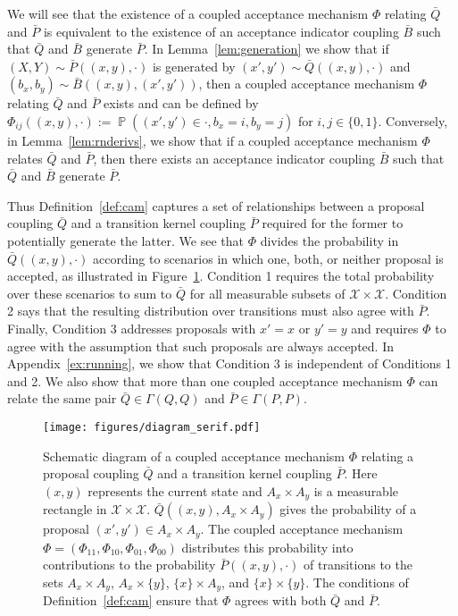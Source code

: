 \documentclass[aihp]{imsart}
\theoremstyle{plain}
\theoremstyle{remark}
\theoremstyle{definition} \newtheorem{example}{Example}
\renewcommand{\P}{\operatorname{\mathbb{P}}}
\newcommand{\calX}{\mathcal{X}}
\newcommand{\cd}{\cdot}
\newcommand{\calXp}{\calX \times \calX}
\newcommand{\bp}{\bar P}
\newcommand{\bq}{\bar Q}
\newcommand{\bb}{\bar B}
\newcommand{\sx}{\{ x \}}
\newcommand{\sy}{\{ y \}}
\newcommand{\xy}{(x,y)}
\newcommand{\xyp}{(x',y')}
\newcommand{\axy}{A_x \times A_y}
\begin{document}
We will see that the existence of a coupled acceptance mechanism $\Phi$ relating $\bq$ and $\bp$ is
equivalent to the existence of an acceptance indicator coupling $\bb$ such that $\bq$ and $\bb$
generate $\bp$. In Lemma~\ref{lem:generation} we show that if $(X,Y) \sim \bp(\xy, \cdot)$ is
generated by $\xyp \sim \bq(\xy, \cdot)$ and $(b_x, b_y) \sim \bb(\xy, \xyp)$, then a coupled
acceptance mechanism $\Phi$ relating $\bq$ and $\bp$ exists and can be defined by $\Phi_{ij}(\xy,
\cd) := \P(\xyp \in \cd, b_x = i, b_y = j)$ for ${i, j \in \{0,1\}}$. Conversely, in
Lemma~\ref{lem:rnderivs}, we show that if a coupled acceptance mechanism $\Phi$ relates $\bq$ and
$\bp$, then there exists an acceptance indicator coupling $\bb$ such that $\bq$ and $\bb$ generate
$\bp$.

Thus Definition~\ref{def:cam} captures a set of relationships between a proposal coupling $\bq$ and
a transition kernel coupling $\bp$ required for the former to potentially generate the latter. We
see that $\Phi$ divides the probability in $\bq(\xy,\cd)$ according to scenarios in which one, both,
or neither proposal is accepted, as illustrated in Figure~\ref{fig:cam}. Condition 1 requires
the total probability over these scenarios to sum to $\bq$ for all measurable subsets of $\calXp$.
Condition 2 says that the resulting distribution over transitions must also agree with $\bp$. Finally,
Condition 3 addresses proposals with $x' = x$ or $y' = y$ and requires $\Phi$ to agree with
the assumption that such proposals are always accepted. In Appendix~\ref{ex:running}, we show that
Condition 3 is independent of Conditions 1 and 2. We also show that more than one coupled acceptance mechanism $\Phi$
can relate the same pair $\bq \in \Gamma(Q,Q)$ and $\bp \in \Gamma(P,P)$.

\begin{figure}[t]
\centering
\texttt{[image: figures/diagram\_serif.pdf]}
\caption{
Schematic diagram of a coupled acceptance mechanism $\Phi$ relating a proposal coupling $\bq$ and a
transition kernel coupling $\bp$. Here $(x,y)$ represents the current state and $\axy$ is a
measurable rectangle in $\calXp$. $\bq(\xy, \axy)$ gives the probability of a proposal $\xyp \in
\axy$. The coupled acceptance mechanism $\Phi = (\Phi_{11},\Phi_{10}, \Phi_{01}, \Phi_{00})$
distributes this probability into contributions to the probability $\bp(\xy, \cd)$ of transitions to
the sets $\axy$, $A_x \times \sy$, $\sx \times A_y$, and $\sx \times \sy$. The conditions of
Definition~\ref{def:cam} ensure that $\Phi$ agrees with both $\bq$ and $\bp$. \label{fig:cam}
}
\end{figure}
\end{document}
